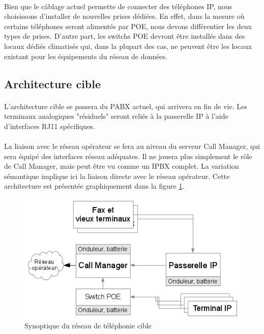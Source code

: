 \paragraph{} Bien que le câblage actuel permette de connecter des téléphones IP,
nous choisissons d'installer de nouvelles prises dédiées. En effet, dans la
mesure où certains téléphones seront alimentés par \ac{POE}, nous devons
différentier les deux types de prises. D'autre part, les switchs \ac{POE}
devront être installés dans des locaux dédiés climatisés qui, dans la plupart
des cas, ne peuvent être les locaux existant pour les équipements du réseau de
données.

\subsection{Architecture cible}
\paragraph{} L'architecture cible se passera du \ac{PABX} actuel, qui arrivera en fin
de vie. Les terminaux analogiques "résiduels" seront reliés à la passerelle IP à
l'aide d'interfaces RJ11 spécifiques.

\paragraph{} La liaison avec le réseau opérateur se fera au niveau du serveur
Call Manager, qui sera équipé des interfaces réseau adéquates. Il ne jouera plus
simplement le rôle de Call Manager, mais peut être vu comme un IPBX complet.
La variation sémantique implique ici la liaison directe avec le réseau
opérateur. Cette architecture est présentée graphiquement dans la figure
\ref{synoptique_cible}.

\begin{figure}[h]
  \caption{\label{synoptique_cible} Synoptique du réseau de téléphonie cible}
  \includegraphics{Cible.png}
\end{figure}
